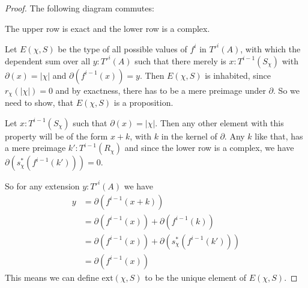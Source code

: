 \begin{proof}
  The following diagram commutes:
  \begin{center}
  \end{center}
  The upper row is exact and the lower row is a complex.

  Let $E(\chi,S)$ be the type of all possible values of $f^i$ in $T'^i(A)$,
  with which the dependent sum over all $y:T'^i(A)$ such that there merely is $x:T^{i-1}(S_\chi)$ with $\partial(x)=|\chi|$
  and $\partial(f^{i-1}(x))=y$.
  Then $E(\chi,S)$ is inhabited, since $r_\chi(|\chi|)=0$ and by exactness, there has to be a mere preimage under $\partial$.
  So we need to show, that $E(\chi,S)$ is a proposition.
  
  Let $x:T^{i-1}(S_\chi)$ such that $\partial(x)=|\chi|$.
  Then any other element with this property will be of the form $x+k$, with $k$ in the kernel of $\partial$.
  Any $k$ like that, has a mere preimage $k':T^{i-1}(R_\chi)$ and since the lower row is a complex, we have $\partial(s_\chi^\ast(f^{i-1}(k')))=0$.
  
  So for any extension $y:T'^{i}(A)$ we have
  \begin{align*}
    y &= \partial(f^{i-1}(x+k)) \\
      &= \partial(f^{i-1}(x))+\partial(f^{i-1}(k)) \\
      &= \partial(f^{i-1}(x))+\partial(s_\chi^\ast(f^{i-1}(k'))) \\
      &= \partial(f^{i-1}(x))
  \end{align*}
  This means we can define $\mathrm{ext}(\chi,S)$ to be the unique element of $E(\chi,S)$.
\end{proof}


